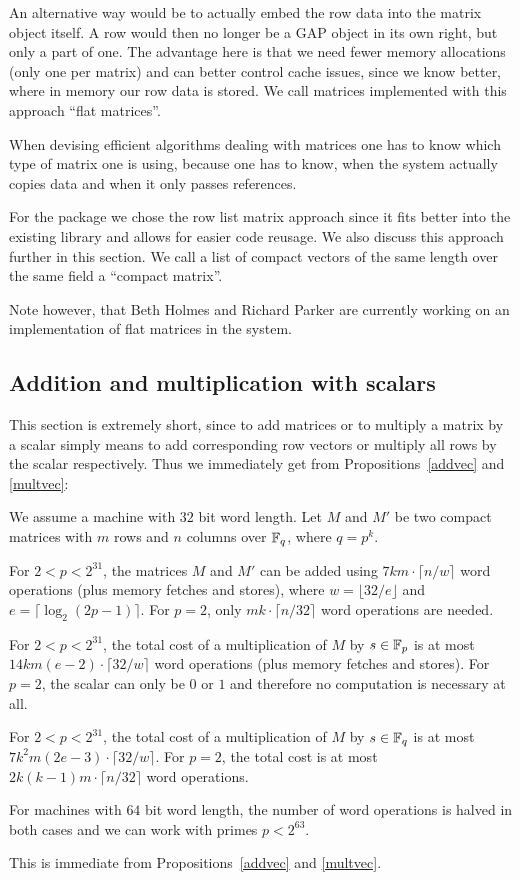An alternative way would be to actually embed the row data into the
matrix object itself. A row would then no longer be a {\sf GAP} object
in its own right, but only a part of one. The advantage here is that
we need fewer memory allocations (only one per matrix) and can better
control cache issues, since we know better, where in memory our row data
is stored. We call matrices implemented with this approach ``flat
matrices''.

When devising efficient algorithms dealing with matrices one has to know
which type of matrix one is using, because one has to know, when the
system actually copies data and when it only passes references.

For the {\cvec} package we chose the row list matrix approach since it fits
better into the existing {\GAP} library and allows for easier code reusage.
We also discuss this approach further in this section. We call a list
of compact vectors of the same length over the same field a ``compact
matrix''.

Note however, that Beth Holmes and Richard Parker are currently working
on an implementation of flat matrices in the {\GAP} system.


\subsection{Addition and multiplication with scalars}
\label{addmulsca}

This section is extremely short, since to add matrices or
to multiply a matrix by a scalar simply means to add corresponding
row vectors or multiply all rows by the scalar respectively.
Thus we immediately get from Propositions~\ref{addvec} and
\ref{multvec}:

\begin{Cor}
We assume a machine with $32$ bit word length. Let $M$ and $M'$ be 
two compact matrices with $m$ rows and $n$ columns over $\mathbb{F}_q$, where $q
= p^k$.

For\/ $2 < p < 2^{31}$, the matrices $M$ and $M'$
can be added using $7km\cdot \lceil n/w \rceil$
word operations
(plus memory fetches and stores), where $w = \lfloor 32/e \rfloor$
and $e = \lceil \log_2(2p-1) \rceil$. 
For $p=2$, only $mk \cdot \lceil n/32 \rceil$ word operations are needed.

For\/ $2 < p < 2^{31}$, the total cost of a multiplication of
$M$ by $s \in \mathbb{F}_p$ is at most 
$14km(e-2)\cdot \lceil 32/w \rceil$ word operations (plus memory fetches
and stores). For $p=2$, the scalar
can only be $0$ or $1$ and therefore no computation is necessary at all.

For\/ $2 < p < 2^{31}$, the total cost of a multiplication of $M$
by $s \in \mathbb{F}_q$ is at most
$7k^2m(2e-3)\cdot \lceil 32/w \rceil$.
 For $p = 2$, the total cost is
at most $2k(k-1)m \cdot \lceil n/32 \rceil$ word operations.

For machines with $64$ bit word length, the number of word operations
is halved in both cases and we can work with primes $p < 2^{63}$.
\end{Cor}
\Proof This is immediate from Propositions~\ref{addvec} and \ref{multvec}.
\ProofEnd


